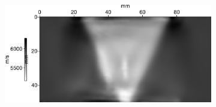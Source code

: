 \documentclass[a4paper,11pt]{report} %
\newenvironment{changemargin}[2]{\begin{list}{}{%
\setlength{\topsep}{0pt}%
\setlength{\leftmargin}{0pt}%
\setlength{\rightmargin}{0pt}%
\setlength{\listparindent}{\parindent}%
\setlength{\itemindent}{\parindent}%
\setlength{\parsep}{0pt plus 1pt}%
\addtolength{\leftmargin}{#1}%
\addtolength{\rightmargin}{#2}%
\setlength{\textwidth}{21cm}
}\item }{\end{list}}
\begin{document}
\begin{figure}[!h]
\begin{changemargin}{-2cm}{-2cm}
		\begin{subfigure}[b]{0.23\textwidth}
			\includegraphics[width=\textwidth]{img/multi_trans/vp_multi_1M.png}
		\end{subfigure}
		

\end{changemargin}
\end{figure}
\end{document}
